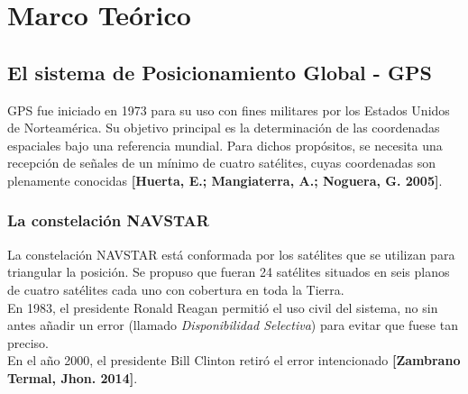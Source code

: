 
\chapter{Marco Teórico} %

\label{Chap:Marco} %




\section{El sistema de Posicionamiento Global - GPS}

GPS fue iniciado en 1973 para su uso con fines militares por los Estados Unidos de Norteamérica. Su objetivo principal es la determinación de las coordenadas espaciales bajo una referencia mundial. Para dichos propósitos, se necesita una recepción de señales de un mínimo de cuatro satélites, cuyas coordenadas son plenamente conocidas
\textbf{[Huerta, E.; Mangiaterra, A.; Noguera, G. 2005]}.

\subsection{La constelación NAVSTAR}

La constelación NAVSTAR está conformada por los satélites que se utilizan para triangular la posición. Se propuso que fueran 24 satélites situados en seis planos de cuatro satélites cada uno con cobertura en toda la Tierra. \\

En 1983, el presidente Ronald Reagan permitió el uso civil del sistema, no sin antes añadir un error (llamado \textit{Disponibilidad Selectiva}) para evitar que fuese tan preciso. \\

En el año 2000, el presidente Bill Clinton retiró el error intencionado \textbf{[Zambrano Termal, Jhon. 2014]}.

